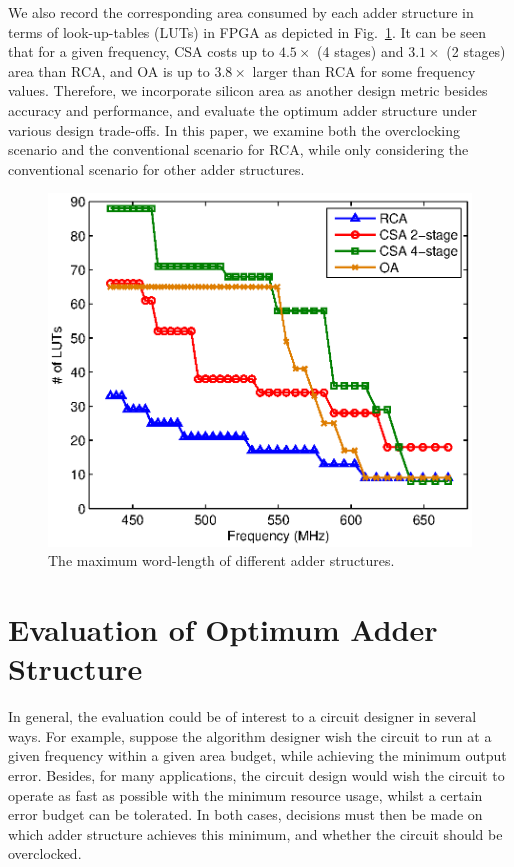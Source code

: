 \documentclass[10pt, conference, compsocconf]{IEEEtran}
\begin{document}
We also record the corresponding area consumed by each adder structure in terms of look-up-tables (LUTs) in FPGA as depicted in Fig.~\ref{Fig:area_adder}. It can be seen that for a given frequency, CSA costs up to $4.5\times$ (4 stages) and $3.1\times$ (2 stages) area than RCA, and OA is up to $3.8\times$ larger than RCA for some frequency values. Therefore, we incorporate silicon area as another design metric besides accuracy and performance, and evaluate the optimum adder structure under various design trade-offs. In this paper, we examine both the overclocking scenario and the conventional scenario for RCA, while only considering the conventional scenario for other adder structures.
%
\begin{figure}[tbp]
  \centering
  \includegraphics[width=.5\textwidth]{./figures/exp/area_adders.eps}
  \caption{The maximum word-length of different adder structures.}
  \label{Fig:area_adder}
\end{figure}



\section{Evaluation of Optimum Adder Structure}
In general, the evaluation could be of interest to a circuit designer in several ways. For example, suppose the algorithm designer wish the circuit to run at a given frequency within a given area budget, while achieving the minimum output error. Besides, for many applications, the circuit design would wish the circuit to operate as fast as possible with the minimum resource usage, whilst a certain error budget can be tolerated. In both cases, decisions must then be made on which adder structure achieves this minimum, and whether the circuit should be overclocked. 
\end{document}
